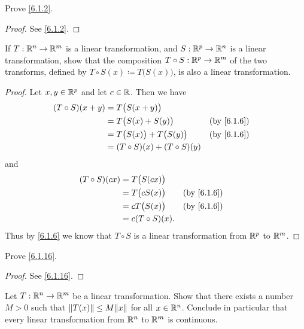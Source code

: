 \exercisesection

\begin{ex}\label{ex:6.1.1}
  Prove \cref{6.1.2}.
\end{ex}

\begin{proof}
  See \cref{6.1.2}.
\end{proof}

\begin{ex}\label{ex:6.1.2}
  If \(T : \mathbb{R}^n \to \mathbb{R}^m\) is a linear transformation, and \(S : \mathbb{R}^p \to \mathbb{R}^n\) is a linear transformation, show that the composition \(T \circ S : \mathbb{R}^p \to \mathbb{R}^m\) of the two transforms, defined by \(T \circ S(x) \coloneqq T\big(S(x)\big)\), is also a linear transformation.
\end{ex}

\begin{proof}
  Let \(x, y \in \mathbb{R}^p\) and let \(c \in \mathbb{R}\).
  Then we have
  \begin{align*}
    (T \circ S)(x + y) & = T\big(S(x + y)\big)                                             \\
                       & = T\big(S(x) + S(y)\big)            &  & \text{(by \cref{6.1.6})} \\
                       & = T\big(S(x)\big) + T\big(S(y)\big) &  & \text{(by \cref{6.1.6})} \\
                       & = (T \circ S)(x) + (T \circ S)(y)
  \end{align*}
  and
  \begin{align*}
    (T \circ S)(cx) & = T\big(S(cx)\big)                                \\
                    & = T\big(c S(x)\big) &  & \text{(by \cref{6.1.6})} \\
                    & = c T\big(S(x)\big) &  & \text{(by \cref{6.1.6})} \\
                    & = c (T \circ S)(x).
  \end{align*}
  Thus by \cref{6.1.6} we know that \(T \circ S\) is a linear transformation from \(\mathbb{R}^p\) to \(\mathbb{R}^m\).
\end{proof}

\begin{ex}\label{ex:6.1.3}
  Prove \cref{6.1.16}.
\end{ex}

\begin{proof}
  See \cref{6.1.16}.
\end{proof}

\begin{ex}\label{ex:6.1.4}
  Let \(T : \mathbb{R}^n \to \mathbb{R}^m\) be a linear transformation.
  Show that there exists a number \(M > 0\) such that \(\norm*{T(x)} \leq M \norm*{x}\) for all \(x \in \mathbb{R}^n\).
  Conclude in particular that every linear transformation from \(\mathbb{R}^n\) to \(\mathbb{R}^m\) is continuous.
\end{ex}

